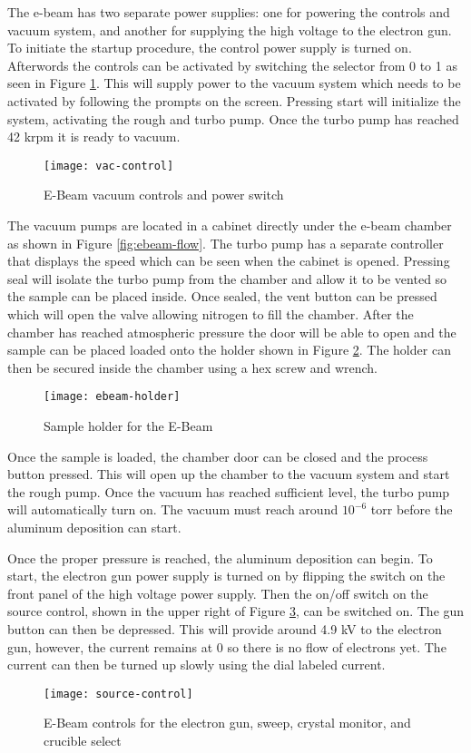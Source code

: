 The e-beam has two separate power supplies: one for powering the controls and vacuum system, and another for supplying the high voltage to the electron gun.
To initiate the startup procedure, the control power supply is turned on.
Afterwords the controls can be activated by switching the selector from 0 to 1 as seen in Figure \ref{fig:vac-control}.
This will supply power to the vacuum system which needs to be activated by following the prompts on the screen.
Pressing start will initialize the system, activating the rough and turbo pump.
Once the turbo pump has reached 42 krpm it is ready to vacuum.
\begin{figure}[htpb]
\centering
\texttt{[image: vac-control]}
\caption{E-Beam vacuum controls and power switch}
\label{fig:vac-control}
\end{figure}

The vacuum pumps are located in a cabinet directly under the e-beam chamber as shown in Figure \ref{fig:ebeam-flow}.
The turbo pump has a separate controller that displays the speed which can be seen when the cabinet is opened.
Pressing seal will isolate the turbo pump from the chamber and allow it to be vented so the sample can be placed inside.
Once sealed, the vent button can be pressed which will open the valve allowing nitrogen to fill the chamber.
After the chamber has reached atmospheric pressure the door will be able to open and the sample can be placed loaded onto the holder shown in Figure \ref{fig:ebeam-holder}.
The holder can then be secured inside the chamber using a hex screw and wrench.
\begin{figure}[htpb]
\centering
\texttt{[image: ebeam-holder]}
\caption{Sample holder for the E-Beam}
\label{fig:ebeam-holder}
\end{figure}
Once the sample is loaded, the chamber door can be closed and the process button pressed.
This will open up the chamber to the vacuum system and start the rough pump.
Once the vacuum has reached sufficient level, the turbo pump will automatically turn on.
The vacuum must reach around $10^{-6}$ torr before the aluminum deposition can start.

Once the proper pressure is reached, the aluminum deposition can begin.
To start, the electron gun power supply is turned on by flipping the switch on the front panel of the high voltage power supply.
Then the on/off switch on the source control, shown in the upper right of Figure \ref{fig:source-control}, can be switched on.
The gun button can then be depressed.
This will provide around 4.9 kV to the electron gun, however, the current remains at 0 so there is no flow of electrons yet.
The current can then be turned up slowly using the dial labeled current.
\begin{figure}[htpb]
\centering
\texttt{[image: source-control]}
\caption{E-Beam controls for the electron gun, sweep, crystal monitor, and crucible select}
\label{fig:source-control}
\end{figure}

